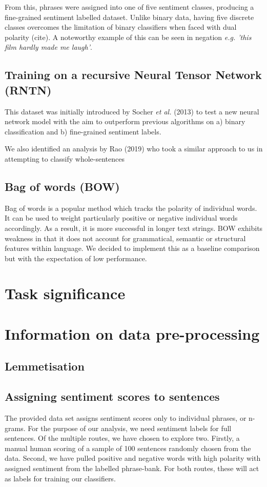 \documentclass[11pt, a4paper]{article}
\begin{document}
From this, phrases were assigned into one of five sentiment classes, producing a fine-grained sentiment labelled dataset. Unlike binary data, having five discrete classes overcomes the limitation of binary classifiers when faced with dual polarity (cite). A noteworthy example of this can be seen in negation \textit{e.g. 'this film hardly made me laugh'}. 

\subsection{Training on a recursive Neural Tensor Network (RNTN)}
This dataset was initially introduced by Socher \textit{et al.} (2013) to test a new neural network model with the aim to outperform previous algorithms on a) binary classification and b) fine-grained sentiment labels.

We also identified an analysis by Rao (2019) who took a similar approach to us in attempting to classify whole-sentences

\subsection{Bag of words (BOW)}
Bag of words is a popular method which tracks the polarity of individual words. It can be used to weight particularly positive or negative individual words accordingly. As a result, it is more successful in longer text strings. BOW exhibits weakness in that it does not account for grammatical, semantic or structural features within language. We decided to implement this as a baseline comparison but with the expectation of low performance.

\section{Task significance}

\section{Information on data pre-processing}

\subsection{Lemmetisation}

\subsection{Assigning sentiment scores to sentences}
The provided data set assigns sentiment scores only to individual phrases, or n-grams. For the purpose of our %
analysis, we need sentiment labels for full sentences. Of the multiple routes, we have chosen to explore two. Firstly, a manual human scoring of a sample of 100 sentences randomly chosen from the data. Second, we have pulled positive and negative words with high polarity with assigned sentiment from the labelled phrase-bank. For both routes, these will act as labels for training our classifiers. 
\end{document}
